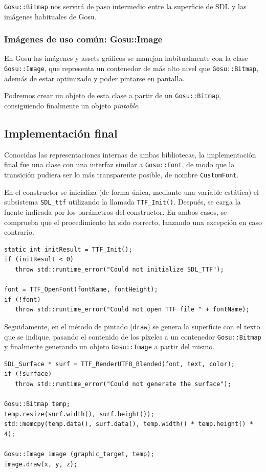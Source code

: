 \texttt{Gosu::Bitmap} nos servirá de paso intermedio entre la superficie de SDL y las
imágenes habituales de Gosu.

\subsubsection{Imágenes de uso común: Gosu::Image}
En Gosu las imágenes y assets gráficos se manejan habitualmente con la clase
\texttt{Gosu::Image}, que representa un contenedor de más alto nivel que
\texttt{Gosu::Bitmap}, además de estar optimizado y poder pintarse en pantalla.

Podremos crear un objeto de esta clase a partir de un \texttt{Gosu::Bitmap}, consiguiendo
finalmente un objeto \textit{pintable}.


\subsection{Implementación final}

Conocidas las representaciones internas de ambas bibliotecas, la implementación
final fue una clase con una interfaz similar a \texttt{Gosu::Font}, de modo que
la transición pudiera ser lo más transparente posible, de nombre
\texttt{CustomFont}.

En el constructor se inicializa (de forma única, mediante una variable estática)
el subsistema \texttt{SDL\_ttf} utilizando la llamada
\texttt{TTF\_Init()}. Después, se carga la fuente indicada por los parámetros
del constructor. En ambos casos, se comprueba que el procedimiento ha sido
correcto, lanzando una excepción en caso contrario.

\begin{verbatim}
static int initResult = TTF_Init();
if (initResult < 0)
   throw std::runtime_error("Could not initialize SDL_TTF");

font = TTF_OpenFont(fontName, fontHeight);
if (!font)
   throw std::runtime_error("Could not open TTF file " + fontName);

\end{verbatim}

Seguidamente, en el método de pintado (\texttt{draw}) se genera la superficie
con el texto que se indique, pasando el contenido de los píxeles a un contenedor
\texttt{Gosu::Bitmap} y finalmente generando un objeto \texttt{Gosu::Image} a
partir del mismo.

\begin{verbatim}
SDL_Surface * surf = TTF_RenderUTF8_Blended(font, text, color);
if (!surface)
   throw std::runtime_error("Could not generate the surface");

Gosu::Bitmap temp;
temp.resize(surf.width(), surf.height());
std::memcpy(temp.data(), surf.data(), temp.width() * temp.height() * 4);

Gosu::Image image (graphic_target, temp);
image.draw(x, y, z);
\end{verbatim}

